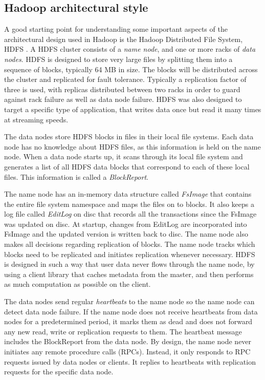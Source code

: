 \documentclass[a4paper,10pt]{article}
\begin{document}
\subsection{Hadoop architectural style}
A good starting point for understanding some important aspects of the architectural design used in Hadoop is the Hadoop Distributed File System, HDFS \cite{borthakur2008}. A HDFS cluster consists of a \emph{name node}, and one or more racks of \emph{data nodes}. HDFS is designed to store very large files by splitting them into a sequence of blocks, typically 64 MB in size. The blocks will be distributed across the cluster and replicated for fault tolerance. Typically a replication factor of three is used, with replicas distributed between two racks in order to guard against rack failure as well as data node failure. HDFS was also designed to target a specific type of application, that writes data once but read it many times at streaming speeds. 

The data nodes store HDFS blocks in files in their local file systems. Each data node has no knowledge about HDFS files, as this information is held on the name node. When a data node starts up, it scans through its local file system and generates a list of all HDFS data blocks that correspond to each of these local files. This information is called a \emph{BlockReport}. 

The name node has an in-memory data structure called \emph{FsImage} that contains the entire file system namespace and maps the files on to blocks. It also keeps a log file called \emph{EditLog} on disc that records all the transactions since the FsImage was updated on disc. At startup, changes from EditLog are incorporated into FsImage and the updated version is written back to disc. The name node also makes all decisions regarding replication of blocks. The name node tracks which blocks need to be replicated and initiates replication whenever necessary. HDFS is designed in such a way that user data never flows through the name node, by using a client library that caches metadata from the master, and then performs as much computation as possible on the client.  

The data nodes send regular \emph{heartbeats} to the name node so the name node can detect data node failure. If the name node does not receive heartbeats from data nodes for a predetermined period, it marks them as dead and does not forward any new read, write or replication requests to them. The heartbeat message includes the BlockReport from the data node. By design, the name node never initiates any remote procedure calls (RPCs). Instead, it only responds to RPC requests issued by data nodes or clients. It replies to heartbeats with replication requests for the specific data node. 
\end{document}
